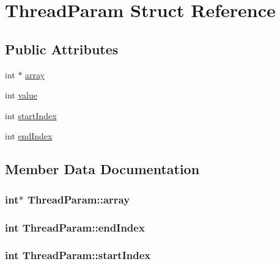 \hypertarget{structThreadParam}{}\section{Thread\+Param Struct Reference}
\label{structThreadParam}
\subsection*{Public Attributes}
\begin{DoxyCompactItemize}
\item 
int $\ast$ \hyperlink{structThreadParam_aec444b4eb12a9a8fea3e8689e149c222}{array}
\item 
int \hyperlink{structThreadParam_a67d5841b5ec120d0265bc55eeb8bac6b}{value}
\item 
int \hyperlink{structThreadParam_a48b6fa880b0369abac96f8f54bf12e08}{start\+Index}
\item 
int \hyperlink{structThreadParam_a88bf854942e7037fbdd9269b434612d6}{end\+Index}
\end{DoxyCompactItemize}


\subsection{Member Data Documentation}
\subsubsection[{\texorpdfstring{array}{array}}]{\setlength{\rightskip}{0pt plus 5cm}int$\ast$ Thread\+Param\+::array}\hypertarget{structThreadParam_aec444b4eb12a9a8fea3e8689e149c222}{}\label{structThreadParam_aec444b4eb12a9a8fea3e8689e149c222}
\subsubsection[{\texorpdfstring{end\+Index}{endIndex}}]{\setlength{\rightskip}{0pt plus 5cm}int Thread\+Param\+::end\+Index}\hypertarget{structThreadParam_a88bf854942e7037fbdd9269b434612d6}{}\label{structThreadParam_a88bf854942e7037fbdd9269b434612d6}
\subsubsection[{\texorpdfstring{start\+Index}{startIndex}}]{\setlength{\rightskip}{0pt plus 5cm}int Thread\+Param\+::start\+Index}\hypertarget{structThreadParam_a48b6fa880b0369abac96f8f54bf12e08}{}\label{structThreadParam_a48b6fa880b0369abac96f8f54bf12e08}
